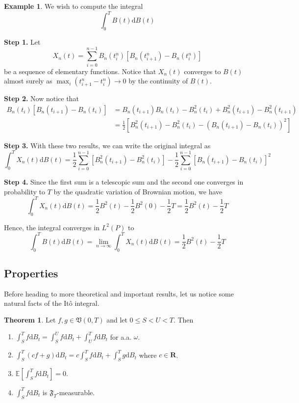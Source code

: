 \documentclass[12pt,a4paper]{article}
\theoremstyle{definition}
\newtheorem{theorem}{Theorem}[section]
\newtheorem{example}{Example}[section]
\begin{document}
\begin{example}
	We wish to compute the integral
	\[
		\int_0^T B(t) \mathrm{d}B(t)
	\]
	
	\textbf{Step 1.} Let
	\[
		X_n(t) = \sum_{i=0}^{n-1} B_n(t_i^n)[B_n(t_{i+1}^n) - B_n(t_i^n)]
	\]
	be a sequence of elementary functions. Notice that $X_n(t)$ converges to $B(t)$ almost surely as $\max_i (t_{i+1}^n - t_i^n) \to 0$ by the continuity of $B(t)$.
	
	\textbf{Step 2.} Now notice that
	\begin{equation*}
		\begin{aligned}
			B_n(t_i)[B_n(t_{i+1}) - B_n(t_i)] &= B_n(t_{i+1}) B_n(t_i) - B_n^2(t_i) + B_n^2(t_{i+1}) - B_n^2(t_{i+1}) \\
			&= \frac{1}{2} [B_n^2(t_{i+1}) - B_n^2(t_i) - (B_n(t_{i+1}) - B_n(t_i))^2 ]
		\end{aligned}
	\end{equation*}
	
	\textbf{Step 3.} With these two results, we can write the original integral as
	\[
		\int_0^T X_n(t) \mathrm{d}B(t) = \frac{1}{2} \sum_{i=0}^{n-1} \left[ B_n^2(t_{i+1}) - B_n^2(t_i) \right] - \frac{1}{2} \sum_{i=0}^{n-1} \left[ B_n(t_{i+1}) - B_n(t_i) \right]^2
	\]
	
	\textbf{Step 4.} Since the first sum is a telescopic sum and the second one converges in probability to $T$ by the quadratic variation of Brownian motion, we have
	\[
		\int_0^T X_n(t) \mathrm{d}B(t) = \frac{1}{2} B^2(t) - \frac{1}{2} B^2(0) - \frac{1}{2}T = \frac{1}{2} B^2(t) - \frac{1}{2}T 
	\]
	
	Hence, the integral converges in $L^2(P)$ to
	\[
		\int_0^T B(t) \mathrm{d}B(t) = \lim_{n \to \infty} \int_0^T X_n(t) \mathrm{d}B(t) = \frac{1}{2} B^2(t) - \frac{1}{2}T 
	\]
\end{example}

\subsection{Properties} %

Before heading to more theoretical and important results, let us notice some natural facts of the Itô integral.

\begin{theorem}
	Let $f, g \in \mathfrak{V}(0,T)$ and let $0 \leq S < U < T$. Then
	\begin{enumerate}
		\item $\int_S^T f \mathrm{d}B_t = \int_S^U f \mathrm{d}B_t + \int_U^T f \mathrm{d}B_t$ for a.a. $\omega$.
		\item $\int_S^T (cf + g) \mathrm{d}B_t = c \int_S^T f \mathrm{d}B_t + \int_S^T g \mathrm{d}B_t$ where $c \in \textbf{R}$.
		\item $\mathbb{E} \left[ \int_S^T f \mathrm{d}B_t \right] = 0$.
		\item $\int_S^T f \mathrm{d}B_t$ is $\mathfrak{F}_T$-measurable.
	\end{enumerate}
\end{theorem}
\end{document}
